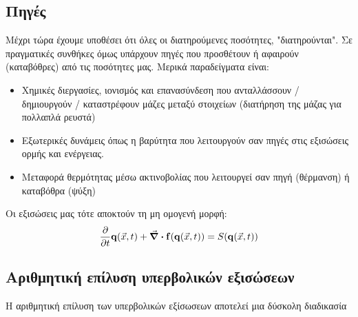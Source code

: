 \subsection{Πηγές}
Μέχρι τώρα έχουμε υποθέσει ότι όλες οι διατηρούμενες ποσότητες, "διατηρούνται". Σε πραγματικές συνθήκες όμως υπάρχουν πηγές που προσθέτουν ή αφαιρούν (καταβόθρες) από τις ποσότητες μας. Μερικά παραδείγματα είναι:
\begin{itemize}
	\item Χημικές διεργασίες, ιονισμός και επανασύνδεση που ανταλλάσσουν / δημιουργούν / καταστρέφουν μάζες μεταξύ στοιχείων (διατήρηση της μάζας για πολλαπλά ρευστά)
	\item Εξωτερικές δυνάμεις όπως η βαρύτητα που λειτουργούν σαν πηγές στις εξισώσεις ορμής και ενέργειας.
	\item Μεταφορά θερμότητας μέσω ακτινοβολίας που λειτουργεί σαν πηγή (θέρμανση) ή καταβόθρα (ψύξη)
\end{itemize}
Οι εξισώσεις μας τότε αποκτούν τη μη ομογενή μορφή:
\begin{equation}
\pdv{t} \mathbf{q}(\vec{x},t) + \div\mathbf{f}(\mathbf{q}(\vec{x},t)) = S(\mathbf{q}(\vec{x},t))
\end{equation}




\subsection{Αριθμητική επίλυση υπερβολικών εξισώσεων}
Η αριθμητική επίλυση των υπερβολικών εξίσωσεων αποτελεί μια δύσκολη διαδικασία
